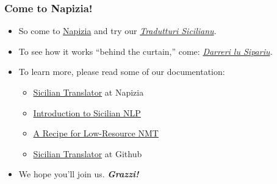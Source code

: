 \documentclass{beamer}
\begin{document}

\begin{frame}
  \frametitle{Come to Napizia!}
  \begin{itemize}
  \item So come to \href{https://www.napizia.com/index.shtml}{Napizia} and try our
    \href{https://translate.napizia.com}{\textit{Tradutturi Sicilianu}}\textit{.}
    \vspace{1em}
  \item To see how it works ``behind the curtain,'' come:
    \href{https://translate.napizia.com/cgi-bin/darreri.pl}{\textit{Darreri lu Sipariu}}\textit{.}
    \vspace{1em}
  \item To learn more, please read some of our documentation:
    \begin{itemize}
    \item \href{https://www.napizia.com/pages/sicilian/translator.shtml}{Sicilian Translator} at Napizia
    \item \href{https://www.doviak.net/pages/ml-sicilian/index.shtml}{Introduction to Sicilian NLP}
    \item \href{https://www.doviak.net/pages/ml-sicilian/ml-scn_p05.shtml}{A Recipe for Low-Resource NMT}
    \item \href{https://github.com/ewdowiak/Sicilian_Translator}{Sicilian Translator} at Github
    \end{itemize}
    \vspace{0.5em}
    \item We hope you'll join us.  \textbf{\textit{Grazzi!}}
  \end{itemize}
\end{frame}

\end{document}
